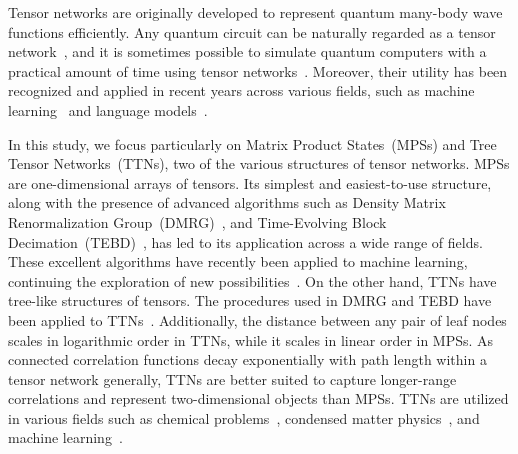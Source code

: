 \documentclass[12pt,dvipdfmx,twoside,openright]{report}
\begin{document}
Tensor networks are originally developed to represent quantum many-body wave functions efficiently.
Any quantum circuit can be naturally regarded as a tensor network~\cite{tn-qc}, and it is sometimes possible to simulate quantum computers with a practical amount of time using tensor networks~\cite{google-ibm}.
Moreover, their utility has been recognized and applied in recent years across various fields, such as machine learning~\cite{tnml} and language models~\cite{tnlanguage}.

In this study, we focus particularly on Matrix Product States~(MPSs) and Tree Tensor Networks~(TTNs), two of the various structures of tensor networks.
MPSs are one-dimensional arrays of tensors.
Its simplest and easiest-to-use structure, along with the presence of advanced algorithms such as Density Matrix Renormalization Group~(DMRG)~\cite{dmrg}, and Time-Evolving Block Decimation~(TEBD)~\cite{tebd}, has led to its application across a wide range of fields.
These excellent algorithms have recently been applied to machine learning, continuing the exploration of new possibilities~\cite{MPSsupervised,MPSgenerative}.
On the other hand, TTNs have tree-like structures of tensors.
The procedures used in DMRG and TEBD have been applied to TTNs~\cite{dmrg-ttn,tebd-ttn}.
Additionally, the distance between any pair of leaf nodes scales in logarithmic order in TTNs, while it scales in linear order in MPSs.
As connected correlation functions decay exponentially with path length within a tensor network generally, TTNs are better suited to capture longer-range correlations and represent two-dimensional objects than MPSs.
TTNs are utilized in various fields such as chemical problems~\cite{chemical1,chemical2}, condensed matter physics~\cite{condmat1,condmat2,condmat3}, and machine learning~\cite{ml1,ml2}.
\end{document}
